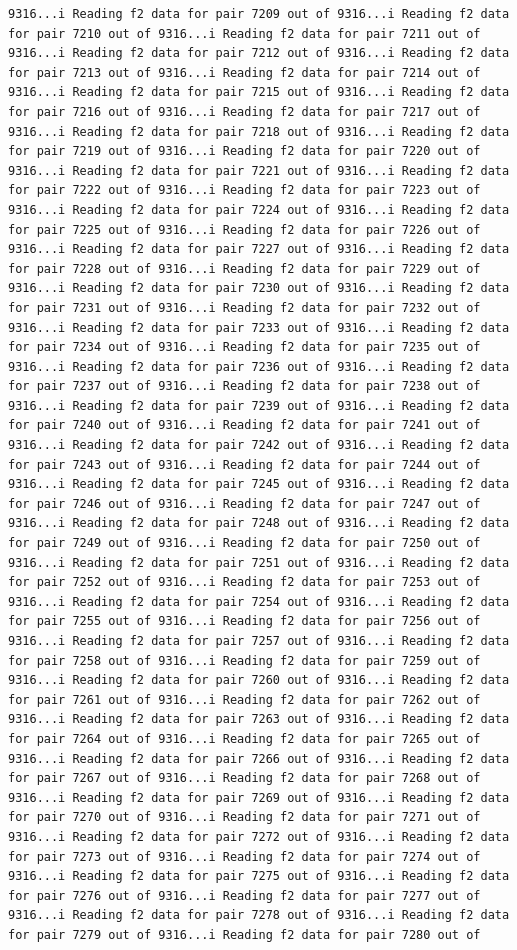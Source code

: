 \documentclass[
]{article}
\begin{document}
\begin{verbatim}
9316...i Reading f2 data for pair 7209 out of 9316...i Reading f2 data for pair 7210 out of 9316...i Reading f2 data for pair 7211 out of 9316...i Reading f2 data for pair 7212 out of 9316...i Reading f2 data for pair 7213 out of 9316...i Reading f2 data for pair 7214 out of 9316...i Reading f2 data for pair 7215 out of 9316...i Reading f2 data for pair 7216 out of 9316...i Reading f2 data for pair 7217 out of 9316...i Reading f2 data for pair 7218 out of 9316...i Reading f2 data for pair 7219 out of 9316...i Reading f2 data for pair 7220 out of 9316...i Reading f2 data for pair 7221 out of 9316...i Reading f2 data for pair 7222 out of 9316...i Reading f2 data for pair 7223 out of 9316...i Reading f2 data for pair 7224 out of 9316...i Reading f2 data for pair 7225 out of 9316...i Reading f2 data for pair 7226 out of 9316...i Reading f2 data for pair 7227 out of 9316...i Reading f2 data for pair 7228 out of 9316...i Reading f2 data for pair 7229 out of 9316...i Reading f2 data for pair 7230 out of 9316...i Reading f2 data for pair 7231 out of 9316...i Reading f2 data for pair 7232 out of 9316...i Reading f2 data for pair 7233 out of 9316...i Reading f2 data for pair 7234 out of 9316...i Reading f2 data for pair 7235 out of 9316...i Reading f2 data for pair 7236 out of 9316...i Reading f2 data for pair 7237 out of 9316...i Reading f2 data for pair 7238 out of 9316...i Reading f2 data for pair 7239 out of 9316...i Reading f2 data for pair 7240 out of 9316...i Reading f2 data for pair 7241 out of 9316...i Reading f2 data for pair 7242 out of 9316...i Reading f2 data for pair 7243 out of 9316...i Reading f2 data for pair 7244 out of 9316...i Reading f2 data for pair 7245 out of 9316...i Reading f2 data for pair 7246 out of 9316...i Reading f2 data for pair 7247 out of 9316...i Reading f2 data for pair 7248 out of 9316...i Reading f2 data for pair 7249 out of 9316...i Reading f2 data for pair 7250 out of 9316...i Reading f2 data for pair 7251 out of 9316...i Reading f2 data for pair 7252 out of 9316...i Reading f2 data for pair 7253 out of 9316...i Reading f2 data for pair 7254 out of 9316...i Reading f2 data for pair 7255 out of 9316...i Reading f2 data for pair 7256 out of 9316...i Reading f2 data for pair 7257 out of 9316...i Reading f2 data for pair 7258 out of 9316...i Reading f2 data for pair 7259 out of 9316...i Reading f2 data for pair 7260 out of 9316...i Reading f2 data for pair 7261 out of 9316...i Reading f2 data for pair 7262 out of 9316...i Reading f2 data for pair 7263 out of 9316...i Reading f2 data for pair 7264 out of 9316...i Reading f2 data for pair 7265 out of 9316...i Reading f2 data for pair 7266 out of 9316...i Reading f2 data for pair 7267 out of 9316...i Reading f2 data for pair 7268 out of 9316...i Reading f2 data for pair 7269 out of 9316...i Reading f2 data for pair 7270 out of 9316...i Reading f2 data for pair 7271 out of 9316...i Reading f2 data for pair 7272 out of 9316...i Reading f2 data for pair 7273 out of 9316...i Reading f2 data for pair 7274 out of 9316...i Reading f2 data for pair 7275 out of 9316...i Reading f2 data for pair 7276 out of 9316...i Reading f2 data for pair 7277 out of 9316...i Reading f2 data for pair 7278 out of 9316...i Reading f2 data for pair 7279 out of 9316...i Reading f2 data for pair 7280 out of 
\end{verbatim}
\end{document}
